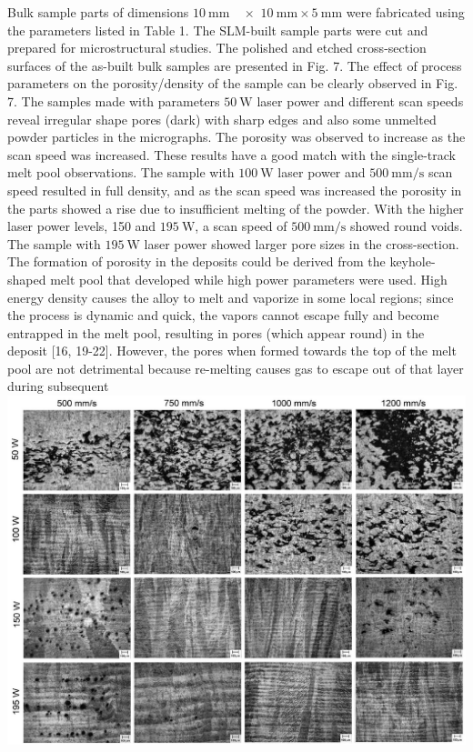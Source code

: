 \documentclass[10pt]{article}
\begin{document}
Bulk sample parts of dimensions $10 \mathrm{~mm} \quad \times$ $10 \mathrm{~mm} \times 5 \mathrm{~mm}$ were fabricated using the parameters listed in Table 1. The SLM-built sample parts were cut and prepared for microstructural studies. The polished and etched cross-section surfaces of the as-built bulk samples are presented in Fig. 7. The effect of process parameters on the porosity/density of the sample can be clearly observed in Fig. 7. The samples made with parameters $50 \mathrm{~W}$ laser power and different scan speeds reveal irregular shape pores (dark) with sharp edges and also some unmelted powder particles in the micrographs. The porosity was observed to increase as the scan speed was increased. These results have a good match with the single-track melt pool observations. The sample with $100 \mathrm{~W}$ laser power and $500 \mathrm{~mm} / \mathrm{s}$ scan speed resulted in full density, and as the scan speed was increased the porosity in the parts showed a rise due to insufficient melting of the powder. With the higher laser power levels, 150 and $195 \mathrm{~W}$, a scan speed of $500 \mathrm{~mm} / \mathrm{s}$ showed round voids. The sample with $195 \mathrm{~W}$ laser power showed larger pore sizes in the cross-section. The formation of porosity in the deposits could be derived from the keyhole-shaped melt pool that developed while high power parameters were used. High energy density causes the alloy to melt and vaporize in some local regions; since the process is dynamic and quick, the vapors cannot escape fully and become entrapped in the melt pool, resulting in pores (which appear round) in the deposit [16, 19-22]. However, the pores when formed towards the top of the melt pool are not detrimental because re-melting causes gas to escape out of that layer during subsequent\\
\includegraphics[max width=\textwidth, center]{2024_02_28_5b6806184856c64a957ag-07}
\end{document}
